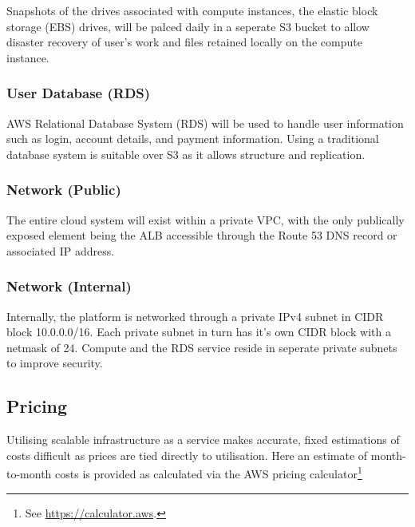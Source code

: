 Snapshots of the drives associated with compute instances, the elastic block storage (EBS) drives, will be palced daily in a seperate S3 bucket to allow disaster recovery of user's work and files retained locally on the compute instance.

\subsubsection*{User Database (RDS)}

AWS Relational Database System (RDS) will be used to handle user information such as login, account details, and payment information. Using a traditional database system is suitable over S3 as it allows structure and replication.

\subsubsection*{Network (Public)}

The entire cloud system will exist within a private VPC, with the only publically exposed element being the ALB accessible through the Route 53 DNS record or associated IP address.

\subsubsection*{Network (Internal)}

Internally, the platform is networked through a private IPv4 subnet in CIDR block 10.0.0.0/16. Each private subnet in turn has it's own CIDR block with a netmask of 24. Compute and the RDS service reside in seperate private subnets to improve security.

\subsection{Pricing}

Utilising scalable infrastructure as a service makes accurate, fixed estimations of costs difficult as prices are tied directly to utilisation. Here an estimate of month-to-month costs is provided as calculated via the AWS pricing calculator\footnote{See \url{https://calculator.aws}.}

